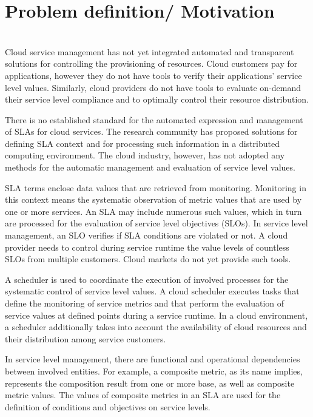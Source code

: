 
\section{Problem definition/ Motivation}\label{problem}
\\
Cloud service management has not yet integrated automated and transparent solutions for controlling the provisioning of resources. Cloud customers pay for applications, however they do not have tools to verify their applications' service level values. Similarly, cloud providers do not have tools to evaluate on-demand their service level compliance and to optimally control their resource distribution.

There is no established standard for the automated expression and management of SLAs for cloud services. The research community has proposed solutions for defining SLA context \cite{wsla, wsag} and for processing such information \cite{lisa, lessons} in a distributed computing environment. The cloud industry, however, has not adopted any methods for the automatic management and evaluation of service level values.

SLA terms enclose data values that are retrieved from monitoring. Monitoring in this context means the systematic observation of metric values that are used by one or more services. An SLA may include numerous such values, which in turn are processed for the evaluation of service level objectives (SLOs). In service level management, an SLO verifies if SLA conditions are violated or not. A cloud provider needs to control during service runtime the value levels of countless SLOs from multiple customers. Cloud markets do not yet provide such tools.

A scheduler is used to coordinate the execution of involved processes for the systematic control of service level values. A cloud scheduler executes tasks that define the monitoring of service metrics and that perform the evaluation of service values at defined points during a service runtime. In a cloud environment, a scheduler additionally takes into account the availability of cloud resources and their distribution among service customers. 
 
In service level management, there are functional and operational dependencies between involved entities. For example, a composite metric, as its name implies, represents the composition result from one or more base, as well as composite metric values. The values of composite metrics in an SLA are used for the definition of conditions and objectives on service levels. 

